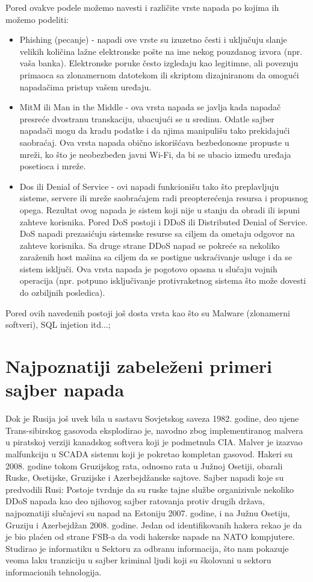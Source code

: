 \documentclass[a4paper]{article}
\begin{document}
{Pored ovakve podele možemo navesti i različite vrste napada po kojima ih možemo podeliti:
\begin{itemize}
    \item Phishing (pecanje) - napadi ove vrste su izuzetno česti i uključuju slanje velikih količina lažne elektronske pošte na ime nekog pouzdanog izvora (npr. vaša banka). Elektronske poruke često izgledaju kao legitimne, ali povezuju primaoca sa zlonamernom datotekom ili skriptom dizajniranom da omogući napadačima pristup vašem uređaju.
    \item MitM ili Man in the Middle - ova vrsta napada se javlja kada napadač presreće dvostranu transkaciju, ubacujući se u sredinu. Odatle sajber napadači mogu da kradu podatke i da njima manipulišu tako prekidajući saobraćaj. Ova vrsta napada obično iskorišćava bezbedonosne propuste u mreži, ko što je neobezbeđen javni Wi-Fi, da bi se ubacio između uređaja posetioca i mreže.
    \item Dos ili Denial of Service - ovi napadi funkcionišu tako što preplavljuju sisteme, servere ili mreže saobraćajem radi preopterećenja resursa i propusnog opega. Rezultat ovog napada je sistem koji nije u stanju da obradi ili ispuni zahteve korisnika.
    Pored DoS postoji i DDoS  ili Distributed Denial of Service. DoS napadi prezasićuju sistemske resurse sa ciljem da ometaju odgovor na zahteve korisnika. Sa druge strane DDoS napad se pokreće sa nekoliko zaraženih host mašina sa ciljem da se postigne uskraćivanje usluge i da se sistem isključi. Ova vrsta napada je pogotovo opasna u slučaju vojnih operacija (npr. potpuno isključivanje protivraketnog sistema što može dovesti do ozbiljnih posledica).
\end{itemize}    
Pored ovih navedenih postoji još dosta vrsta kao što su Malware (zlonamerni softveri), SQL injetion itd...;






\section{Najpoznatiji zabeleženi primeri sajber napada}
\label{sec:naslovM}



Dok je Rusija još uvek bila u sastavu Sovjetskog saveza 1982. godine, deo njene Trans-sibirskog gasovoda eksplodirao je, navodno zbog implementiranog malvera u piratskoj verziji kanadskog softvera koji je podmetnula CIA. Malver je izazvao malfunkciju u SCADA sistemu koji je pokretao kompletan gasovod.
Hakeri su 2008. godine tokom Gruzijskog rata, odnosno rata u Južnoj Osetiji, obarali Ruske, Osetijske, Gruzijske i Azerbejdžanske sajtove.
Sajber napadi koje su predvodili Rusi:
Postoje tvrdnje da su ruske tajne službe organizivale nekoliko DDoS napada kao deo njihovog sajber ratovanja protiv drugih država, najpoznatiji slučajevi su napad na Estoniju 2007. godine, i na Južnu Osetiju, Gruziju i Azerbejdžan 2008. godine. Jedan od identifikovanih hakera rekao je da je bio plaćen od strane FSB-a da vodi hakerske napade na NATO kompjutere. Studirao je informatiku u Sektoru za odbranu informacija, što nam pokazuje veoma laku tranziciju u sajber kriminal ljudi koji su školovani u sektoru informacionih tehnologija.

}
\end{document}
